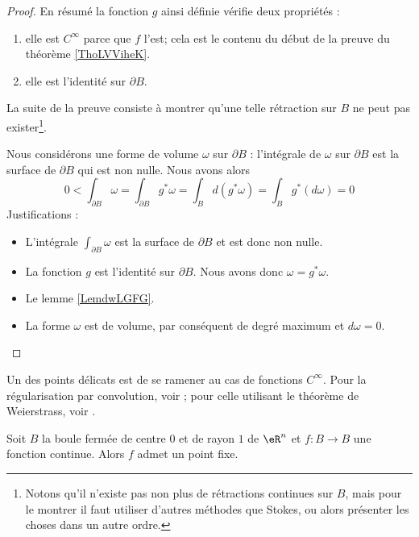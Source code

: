 \begin{proof}
    En résumé la fonction \( g\) ainsi définie vérifie deux propriétés :
    \begin{enumerate}
        \item
            elle est \(  C^{\infty}\) parce que \( f\) l'est; cela est le contenu du début de la preuve du théorème \ref{ThoLVViheK}.
        \item
            elle est l'identité sur \( \partial B\).
    \end{enumerate}
    La suite de la preuve consiste à montrer qu'une telle rétraction sur \( B\) ne peut pas exister\footnote{Notons qu'il n'existe pas non plus de rétractions continues sur \( B\), mais pour le montrer il faut utiliser d'autres méthodes que Stokes, ou alors présenter les choses dans un autre ordre.}.

    Nous considérons une forme de volume \( \omega\) sur \( \partial B\) : l'intégrale de \( \omega\) sur \( \partial B\) est la surface de \( \partial B\) qui est non nulle. Nous avons alors
    \begin{equation}
        0<\int_{\partial B}\omega
        =\int_{\partial B}g^*\omega
        =\int_Bd(g^*\omega)
        =\int_Bg^*(d\omega)
        =0
    \end{equation}
    Justifications :
    \begin{itemize}
        \item 
            L'intégrale \( \int_{\partial B}\omega\) est la surface de \( \partial B\) et est donc non nulle.
        \item
            La fonction \( g\) est l'identité sur \( \partial B\). Nous avons donc \( \omega=g^*\omega\).
        \item
            Le lemme \ref{LemdwLGFG}.
        \item
            La forme \( \omega\) est de volume, par conséquent de degré maximum et \( d\omega=0\).
    \end{itemize}
\end{proof}

Un des points délicats est de se ramener au cas de fonctions \( C^{\infty}\). Pour la régularisation par convolution, voir \cite{AllardBrouwer}; pour celle utilisant le théorème de Weierstrass, voir \cite{KuttlerTopInAl}.
\begin{theorem}\label{ThoRGjGdO}
    Soit \( B\) la boule fermée de centre \( 0\) et de rayon \( 1\) de \( \eR^n\) et \( f\colon B\to B\) une fonction continue. Alors \( f\) admet un point fixe.
\end{theorem}

